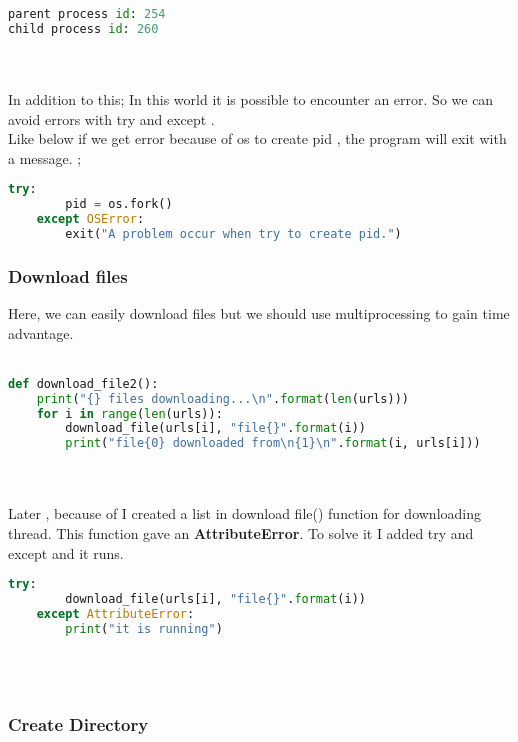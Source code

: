 \documentclass[onecolumn]{article}
\begin{document}
\begin{lstlisting}[language=Python, caption= Output]
parent process id: 254
child process id: 260
\end{lstlisting} \\ \\

In addition to this; In this world it is possible to encounter an error. So we can avoid errors with try and except . \\
Like below if we get error because of os to create pid , the program will exit with a message. ;

\begin{lstlisting}[language=Python, caption= Output]
try:
		pid = os.fork()
	except OSError:
		exit("A problem occur when try to create pid.")
\end{lstlisting}


\subsubsection{Download files }
Here, we can easily download files but we should use multiprocessing to gain time advantage. \\ \\

\begin{lstlisting}[language=Python, caption= Downloading files ]
def download_file2():
    print("{} files downloading...\n".format(len(urls)))
    for i in range(len(urls)):
        download_file(urls[i], "file{}".format(i))
        print("file{0} downloaded from\n{1}\n".format(i, urls[i]))
\end{lstlisting} \\ \\

Later , because of  I created a list in download file() function for downloading thread. This function gave an 
\textbf{AttributeError}. To solve it I added try and except and it runs.


\begin{lstlisting}[language=Python, caption= Try - Except]
    try:
        download_file(urls[i], "file{}".format(i))
    except AttributeError:
        print("it is running")
\end{lstlisting} \\ \\


\subsubsection{Create Directory }
\end{document}
